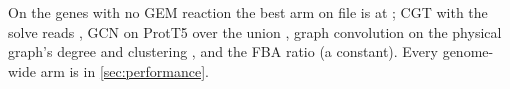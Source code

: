  On the \ggenomeN{} genes with no GEM reaction the best
arm on file is \ggenBestName{} at \ggenBest{}; CGT with the solve reads
\ggenlayerFree{}, GCN on ProtT5 over the union \ggengcnProt{}, graph
convolution on the physical graph's degree and clustering \ggengcnDegree{}, and the FBA
ratio \ggenfba{} (a constant). Every genome-wide arm is in \ref{sec:performance}.
